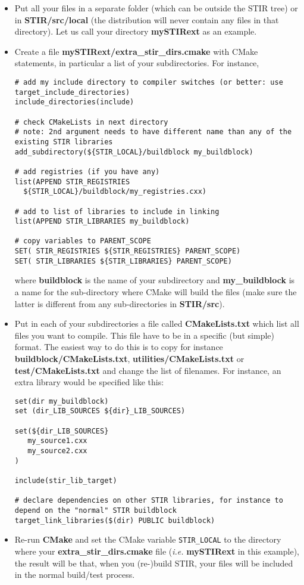 \documentclass{article}
\begin{document}
\begin{itemize}
\item Put all your files in a separate folder (which can be outside the STIR tree) or in \textbf{STIR/src/local} (the distribution 
will never contain any files in that directory). Let us call your directory 
\textbf{mySTIRext} as an example.
\item Create a file \textbf{mySTIRext/extra\_stir\_dirs.cmake} with CMake statements,
in particular a list of your subdirectories. For instance,
\begin{verbatim}
# add my include directory to compiler switches (or better: use target_include_directories)
include_directories(include)

# check CMakeLists in next directory
# note: 2nd argument needs to have different name than any of the existing STIR libraries
add_subdirectory(${STIR_LOCAL}/buildblock my_buildblock)

# add registries (if you have any)
list(APPEND STIR_REGISTRIES 
  ${STIR_LOCAL}/buildblock/my_registries.cxx)

# add to list of libraries to include in linking
list(APPEND STIR_LIBRARIES my_buildblock)

# copy variables to PARENT_SCOPE
SET( STIR_REGISTRIES ${STIR_REGISTRIES} PARENT_SCOPE)
SET( STIR_LIBRARIES ${STIR_LIBRARIES} PARENT_SCOPE)

\end{verbatim}
where \textbf{buildblock} is the name of your subdirectory and \textbf{my\_buildblock} is a name for the
sub-directory where CMake will build the files (make sure the latter is different from any
sub-directories in \textbf{STIR/src}).

\item Put in each of your subdirectories a file called \textbf{CMakeLists.txt}
which list all files you want to compile. This file have to 
be in a specific (but simple) format. The easiest way to do this 
is to copy for instance \textbf{buildblock/CMakeLists.txt}, \textbf{utilities/CMakeLists.txt}
or  \textbf{test/CMakeLists.txt} and change the list of filenames. For instance, an extra library
would be specified like this:
\begin{verbatim}
set(dir my_buildblock)
set (dir_LIB_SOURCES ${dir}_LIB_SOURCES)

set(${dir_LIB_SOURCES}
   my_source1.cxx
   my_source2.cxx
)

include(stir_lib_target)

# declare dependencies on other STIR libraries, for instance to depend on the "normal" STIR buildblock
target_link_libraries($(dir) PUBLIC buildblock)
\end{verbatim}

\item Re-run \textbf{CMake} and set the CMake variable \texttt{STIR\_LOCAL} to the directory where your
\textbf{extra\_stir\_dirs.cmake} file (\textit{i.e.} \textbf{mySTIRext} in this example),
the result will be that, when you (re-)build STIR, your files will be included in 
the normal build/test process.
\end{itemize}
\end{document}
